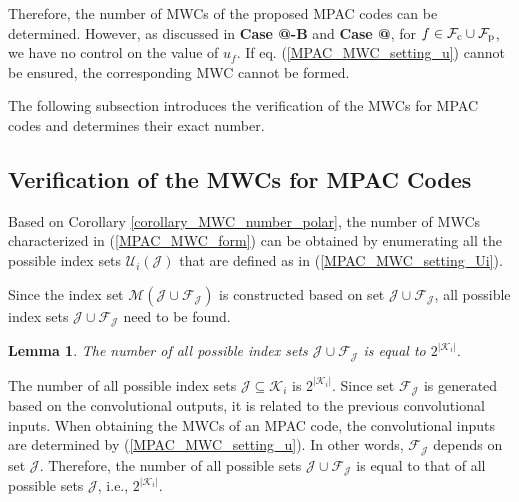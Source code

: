 \documentclass[12pt, draftclsnofoot, peerreview, onecolumn]{IEEEtran}
\makeatletter
\theoremstyle{noparent}
\newtheorem{lemma}[theorem]{\textbf{Lemma}}
\newcommand{\Rmnum}[1]{\expandafter\@slowromancap\romannumeral #1@}
\renewenvironment{proof}[1][\proofname]{\par
  \pushQED{\qed}
  \normalfont \topsep6\p@\@plus6\p@\relax
  \trivlist
  \item[\hskip\labelsep
        \itshape
    #1\@addpunct{:}]\ignorespaces
}{
  \popQED\endtrivlist\@endpefalse
}
\makeatother
\begin{document}
Therefore, the number of MWCs of the proposed MPAC codes can be determined.
However, as discussed in \textbf{Case \Rmnum{1}-B} and \textbf{Case \Rmnum{3}}, for $f\in\mathcal{F}_{\rm c}\cup\mathcal{F}_{\rm p}$,
we have no control on the value of $u_f$.
If eq. (\ref{MPAC_MWC_setting_u}) cannot be ensured, the corresponding MWC cannot be formed.



The following subsection introduces the verification of the  MWCs for MPAC codes and determines their exact number.


\subsection{Verification of the MWCs for MPAC Codes}
\label{sec:verification_MWCs}

Based on Corollary \ref{corollary_MWC_number_polar}, 
the number of MWCs characterized in (\ref{MPAC_MWC_form})
can be obtained by enumerating all the possible 
index sets $\mathcal{U}_i(\mathcal{J})$ that are defined as in (\ref{MPAC_MWC_setting_Ui}).

Since the index set $\mathcal{M}(\mathcal{J} \cup \mathcal{F}_\mathcal{J})$ is constructed based on
set $\mathcal{J} \cup \mathcal{F}_\mathcal{J}$,
all possible index sets $\mathcal{J} \cup \mathcal{F}_\mathcal{J}$ need to be found\cite{Rowshan2023MinimumWeightCodewords}.

\begin{lemma}
    \label{lemma_MPAC_upper_bound}
    The number of all possible index sets  $\mathcal{J} \cup \mathcal{F}_\mathcal{J}$ is equal to $2^{\left|\mathcal{K}_{i}\right|}$.
\end{lemma}

\begin{proof}[\hspace{1.5em}Proof]
    The number of all possible index sets $\mathcal{J}\subseteq\mathcal{K}_i$ 
    is $2^{\left|\mathcal{K}_{i}\right|}$.
    Since set $\mathcal{F}_\mathcal{J}$ is generated based on the 
    convolutional outputs, it is related to the previous convolutional inputs.
    When obtaining the MWCs of an MPAC code, the convolutional inputs are 
    determined by (\ref{MPAC_MWC_setting_u}).
    In other words, $\mathcal{F}_\mathcal{J}$ depends on set $\mathcal{J}$.
    Therefore, the number of all possible sets $\mathcal{J} \cup \mathcal{F}_\mathcal{J}$ 
    is equal to that of all possible sets $\mathcal{J}$, 
    i.e., $2^{\left|\mathcal{K}_{i}\right|}$.
\end{proof}
\end{document}
